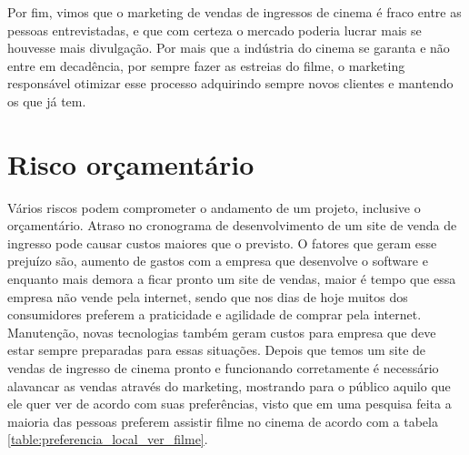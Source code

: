 \documentclass[12pt]{article}
\begin{document}
      \begin{table}[h]
            \centering
            \caption{Propagandas de vendas de ingressos geralmente estão relacionadas com seu gosto?}
            \label{table:Propagandas_ao_gosto}
        \end{table}
        \FloatBarrier
    Por fim, vimos que o marketing de vendas de ingressos de cinema é fraco entre as pessoas entrevistadas, e que com certeza o mercado poderia lucrar mais se houvesse mais divulgação. Por mais que a indústria do cinema se garanta e não entre em decadência, por sempre fazer as estreias do filme, o marketing responsável otimizar esse processo adquirindo sempre novos clientes e mantendo os que já tem.

    \section{Risco orçamentário}
        Vários riscos podem comprometer o andamento de um projeto, inclusive o orçamentário.
        Atraso no cronograma de desenvolvimento de um site de venda de ingresso pode causar custos maiores que o previsto. O fatores que geram esse prejuízo são, aumento de gastos com a empresa que desenvolve o software e enquanto mais demora a ficar pronto um site de vendas, maior é tempo que essa empresa não vende pela internet, sendo que nos dias de hoje muitos dos consumidores preferem a praticidade e agilidade de comprar pela internet.
        Manutenção, novas tecnologias também geram custos para empresa que deve estar sempre preparadas para essas situações.
        Depois que temos um site de vendas de ingresso de cinema pronto e funcionando corretamente é necessário alavancar as vendas através do marketing, mostrando para o público aquilo que ele quer ver de acordo com suas preferências, visto que em uma pesquisa feita a maioria das pessoas preferem assistir filme no cinema de acordo com a tabela \ref{table:preferencia_local_ver_filme}.
    
\end{document}
